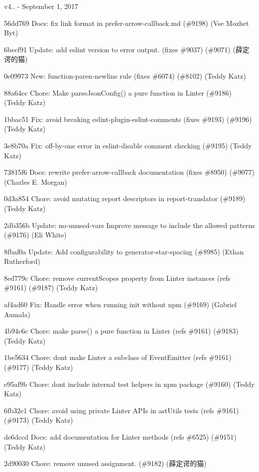 v4.. -\/ September 1, 2017


\begin{DoxyItemize}
\item 56dd769 Docs\+: fix link format in prefer-\/arrow-\/callback.\+md (\#9198) (Vse Mozhet Byt)
\item 6becf91 Update\+: add eslint version to error output. (fixes \#9037) (\#9071) (薛定谔的猫)
\item 0e09973 New\+: function-\/paren-\/newline rule (fixes \#6074) (\#8102) (Teddy Katz)
\item 88a64cc Chore\+: Make parse\+Json\+Config() a pure function in Linter (\#9186) (Teddy Katz)
\item 1bbac51 Fix\+: avoid breaking eslint-\/plugin-\/eslint-\/comments (fixes \#9193) (\#9196) (Teddy Katz)
\item 3e8b70a Fix\+: off-\/by-\/one error in eslint-\/disable comment checking (\#9195) (Teddy Katz)
\item 73815f6 Docs\+: rewrite prefer-\/arrow-\/callback documentation (fixes \#8950) (\#9077) (Charles E. Morgan)
\item 0d3a854 Chore\+: avoid mutating report descriptors in report-\/translator (\#9189) (Teddy Katz)
\item 2db356b Update\+: no-\/unused-\/vars Improve message to include the allowed patterns (\#9176) (Eli White)
\item 8fbaf0a Update\+: Add configurability to generator-\/star-\/spacing (\#8985) (Ethan Rutherford)
\item 8ed779c Chore\+: remove current\+Scopes property from Linter instances (refs \#9161) (\#9187) (Teddy Katz)
\item af4ad60 Fix\+: Handle error when running init without npm (\#9169) (Gabriel Aumala)
\item 4b94c6c Chore\+: make parse() a pure function in Linter (refs \#9161) (\#9183) (Teddy Katz)
\item 1be5634 Chore\+: don\textquotesingle{}t make Linter a subclass of Event\+Emitter (refs \#9161) (\#9177) (Teddy Katz)
\item e95af9b Chore\+: don\textquotesingle{}t include internal test helpers in npm package (\#9160) (Teddy Katz)
\item 6fb32e1 Chore\+: avoid using private Linter APIs in ast\+Utils tests (refs \#9161) (\#9173) (Teddy Katz)
\item de6dccd Docs\+: add documentation for Linter methods (refs \#6525) (\#9151) (Teddy Katz)
\item 2d90030 Chore\+: remove unused assignment. (\#9182) (薛定谔的猫)

\end{DoxyItemize}
